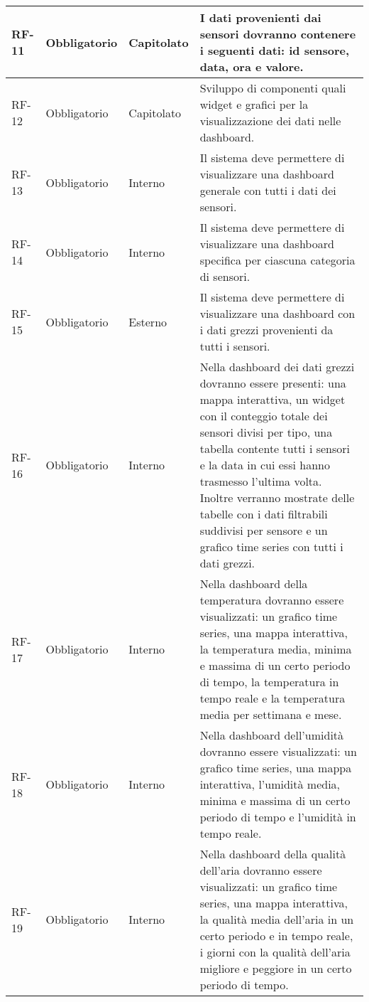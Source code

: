 \begin{longtable}{|>{\centering\arraybackslash}m{}|>{\centering\arraybackslash}m{}|>{\centering\arraybackslash}m{}|>{\centering\arraybackslash}m{}|}
	\\\hline
	RF-11           & Obbligatorio        & Capitolato     & I dati provenienti dai sensori dovranno contenere i seguenti dati: id sensore, data, ora e valore.
	\\\hline
	RF-12           & Obbligatorio        & Capitolato     & Sviluppo di componenti quali widget e grafici per la visualizzazione dei dati nelle dashboard.
	\\\hline
	RF-13           & Obbligatorio        & Interno        & Il sistema deve permettere di visualizzare una dashboard generale con tutti i dati dei sensori.
	\\\hline
	RF-14           & Obbligatorio        & Interno        & Il sistema deve permettere di visualizzare una dashboard specifica per ciascuna categoria di sensori.
	\\\hline
	RF-15           & Obbligatorio        & Esterno        & Il sistema deve permettere di visualizzare una dashboard con i dati grezzi provenienti da tutti i sensori.
	\\\hline
	RF-16           & Obbligatorio        & Interno        & Nella dashboard dei dati grezzi dovranno essere presenti: una mappa interattiva, un widget con il conteggio totale dei sensori divisi per tipo, una tabella contente tutti i sensori e la data in cui essi hanno trasmesso l'ultima volta. Inoltre verranno mostrate delle tabelle con i dati filtrabili suddivisi per sensore e un grafico time series con tutti i dati grezzi. 
	\\\hline
	RF-17           & Obbligatorio        & Interno        & Nella dashboard della temperatura dovranno essere visualizzati: un grafico time series, una mappa interattiva, la temperatura media, minima e massima di un certo periodo di tempo, la temperatura in tempo reale e la temperatura media per settimana e mese.
	\\\hline
	RF-18           & Obbligatorio        & Interno        & Nella dashboard dell'umidità dovranno essere visualizzati: un grafico time series, una mappa interattiva, l'umidità media, minima e massima di un certo periodo di tempo e l'umidità in tempo reale.
	\\\hline
	RF-19           & Obbligatorio        & Interno        & Nella dashboard della qualità dell'aria dovranno essere visualizzati: un grafico time series, una mappa interattiva, la qualità media dell'aria in un certo periodo e in tempo reale, i giorni con la qualità dell'aria migliore e peggiore in un certo periodo di tempo.
	\\\hline

\end{longtable}
